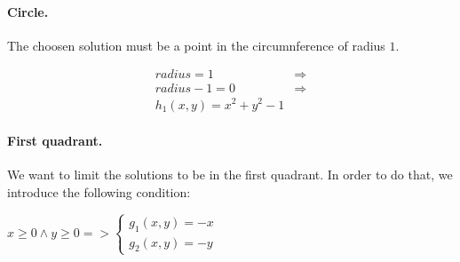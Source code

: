 \paragraph{Circle.} The choosen solution must be a point in the circumnference of radius \( 1 \). 

\begin{minipage}{0.48\linewidth}
    \center
    \begin{equation*}
        \begin{split}
            \mathit{radius} = 1         & \Rightarrow \\
            \mathit{radius} - 1 = 0     & \Rightarrow \\
            h_1(x, y) = x^2 + y^2 - 1     &
        \end{split}
    \end{equation*}
\end{minipage}
\begin{minipage}{0.5\linewidth}
    \center
\end{minipage}

\paragraph{First quadrant.} We want to limit the solutions to be in the first quadrant. In order to do that, we introduce the following condition:

\begin{minipage}{0.49\linewidth}
    \center
    \( 
        x \geq 0 \land y \geq 0 =>  
        \left\{
        \begin{array}{l}
            g_1(x, y) = -x \\
            g_2(x, y) = -y
        \end{array}\right.
    \)
\end{minipage}
\begin{minipage}{0.49\linewidth}
    \center
\end{minipage}


